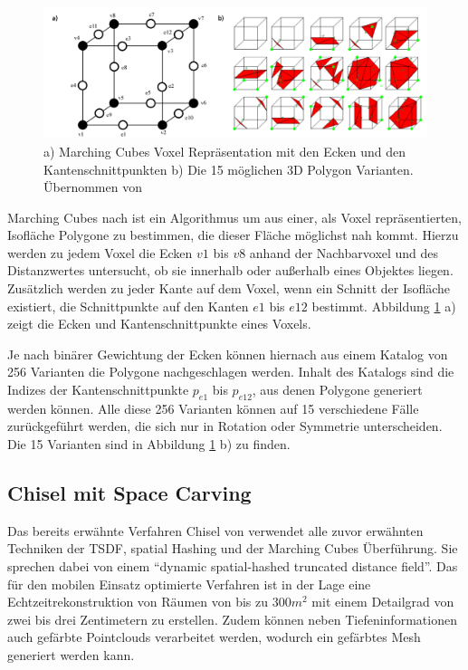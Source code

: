 \begin{figure}[h]
  \centering
	\includegraphics[width=1.0\textwidth]{content/images/methods/marchingcubes.png} 
  \caption{a) Marching Cubes Voxel Repräsentation mit den Ecken und den Kantenschnittpunkten b) Die 15 möglichen 3D Polygon Varianten. Übernommen von \citet{MarchingCubes:online}}
  \label{fig:marchingcubes}
\end{figure}

Marching Cubes nach \citet{lorensen1987marching} ist ein Algorithmus um aus einer, als Voxel repräsentierten, Isofläche Polygone zu bestimmen, die dieser Fläche möglichst nah kommt. Hierzu werden zu jedem Voxel die Ecken \(v1\) bis \(v8\) anhand der Nachbarvoxel und des Distanzwertes untersucht, ob sie innerhalb oder außerhalb eines Objektes liegen. Zusätzlich werden zu jeder Kante auf dem Voxel, wenn ein Schnitt der Isofläche existiert, die Schnittpunkte auf den Kanten \(e1\) bis \(e12\) bestimmt. Abbildung \ref{fig:marchingcubes} a) zeigt die Ecken und Kantenschnittpunkte eines Voxels. 

Je nach binärer Gewichtung der Ecken können hiernach aus einem Katalog von 256 Varianten die Polygone nachgeschlagen werden. Inhalt des Katalogs sind die Indizes der Kantenschnittpunkte \(p_{e1}\) bis \(p_{e12}\), aus denen Polygone generiert werden können. Alle diese 256 Varianten können auf 15 verschiedene Fälle zurückgeführt werden, die sich nur in Rotation oder Symmetrie unterscheiden. Die 15 Varianten sind in Abbildung \ref{fig:marchingcubes} b) zu finden. \citep{MarchingCubes:online} 

\subsection{Chisel mit Space Carving}

Das bereits erwähnte Verfahren Chisel von \citet{Klingensmith_2015_7924} verwendet alle zuvor erwähnten Techniken der TSDF, spatial Hashing und der Marching Cubes Überführung. Sie sprechen dabei von einem \enquote{dynamic spatial-hashed truncated distance field}. Das für den mobilen Einsatz optimierte Verfahren ist in der Lage eine Echtzeitrekonstruktion von Räumen von bis zu \(300 m^2\) mit einem Detailgrad von zwei bis drei Zentimetern zu erstellen. Zudem können neben Tiefeninformationen auch gefärbte Pointclouds verarbeitet werden, wodurch ein gefärbtes Mesh generiert werden kann. \citep{Klingensmith_2015_7924}

